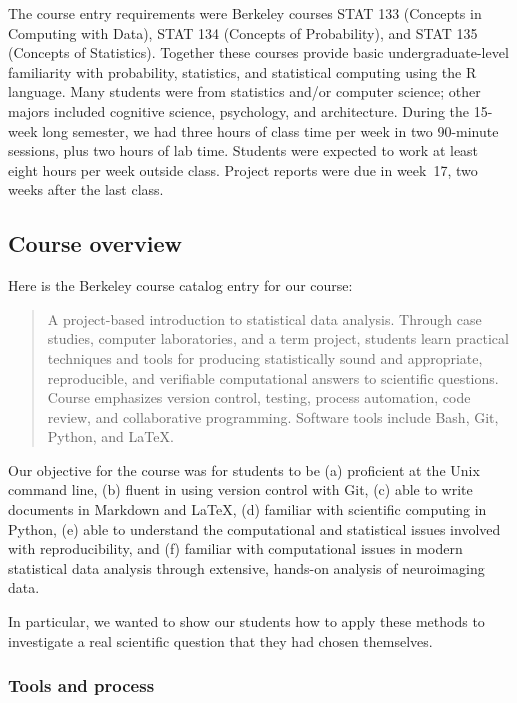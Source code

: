 The course entry requirements were Berkeley courses STAT 133 (Concepts in
Computing with Data), STAT 134 (Concepts of Probability), and STAT 135
(Concepts of Statistics).  Together these courses provide basic
undergraduate-level familiarity with probability, statistics, and statistical
computing using the R language.
Many students were from statistics and/or computer science; other majors
included cognitive science, psychology, and architecture.
During the 15-week long semester, we had three hours of class time per week in
two 90-minute sessions, plus two hours of lab time.  Students were expected to
work at least eight hours per week outside class.  Project reports were due in
week~17, two weeks after the last class.

\subsection{Course overview}

Here is the Berkeley course catalog entry for our course:

\begin{quote}
A project-based introduction to statistical data analysis. Through case
studies, computer laboratories, and a term project, students learn
practical techniques and tools for producing statistically sound and
appropriate, reproducible, and verifiable computational answers to
scientific questions. Course emphasizes version control, testing,
process automation, code review, and collaborative programming.
Software tools include Bash, Git, Python, and \LaTeX.
\end{quote}

Our objective for the course was for students to be
(a) proficient at the Unix command line,
(b) fluent in using version control with Git,
(c) able to write documents in Markdown and \LaTeX,
(d) familiar with scientific computing in Python,
(e) able to understand the computational and statistical issues involved with
reproducibility, and
(f) familiar with computational issues in modern statistical data
analysis through extensive, hands-on analysis of neuroimaging data.

In particular, we wanted to show our students how to apply these methods to
investigate a real scientific question that they had chosen themselves.

\subsubsection{Tools and process}

